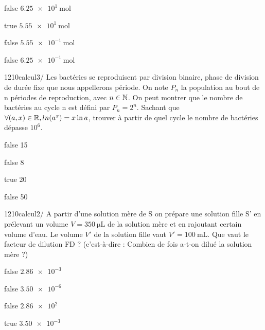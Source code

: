 \documentclass[11pt]{article}
\begin{document}
            \begin{reponses}
            	\item[false] $\SI{6.25e1}{\mol} $
            	\item[true]  $ \SI{5.55e1}{\mol} $
                \item[false] $ \SI{5.55e-1}{\mol} $
                \item[false] $ \SI{6.25e-1}{\mol} $
            \end{reponses}
			
			
			\begin{question}{1210}{calcul}{3}{/}
				  Les bactéries se reproduisent par division binaire, phase de division de durée fixe que nous appellerons période. On note $P_n$ la population au bout de n périodes de reproduction, avec $n \in \mathbb {N}  $. On peut montrer que le nombre de bactéries au cycle n est défini par $P_n = 2^n$. Sachant que $\forall (a,x) \in \mathbb {R} , ln(a^x) = x\ln{a}$, trouver à partir de quel cycle le nombre de bactéries dépasse $10^6$. 

            \end{question}

            \begin{reponses}
            	\item[false] 15
            	\item[false] 8
                \item[true]  20
                \item[false] 50
            \end{reponses}
		    
			\begin{question}{1210}{calcul}{2}{/}
				 A partir d’une solution mère de S on prépare une solution fille S' en prélevant un volume $V = \SI{350}{\micro\liter}$ de la solution mère et en rajoutant certain volume d’eau. Le volume $V'$ de la solution fille vaut $V' = \SI{100}{\milli\liter}$. Que vaut le facteur de dilution FD ? (c'est-à-dire : Combien de fois a-t-on dilué la solution mère ?) 
                 

            \end{question}

            \begin{reponses}
            	\item[false]  $\SI{2.86e-3}{} $
            	\item[false]  $ \SI{3.50e-6}{}$
                \item[false]  $ \SI{2.86e2}{}$
                \item[true]   $ \SI{3.50e-3}{}$
            \end{reponses}
			
\end{document}
